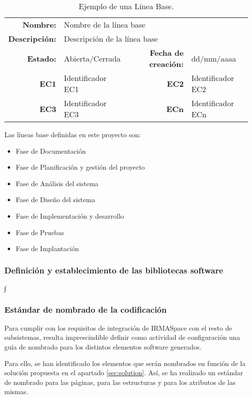 \begin{table}[h]
\begin{center}
\begin{tabular}{ r l | r l }
\hline
\textbf{Nombre:} & \multicolumn{3}{l}{Nombre de la línea base} \\
\textbf{Descripción:} & \multicolumn{3}{l}{Descripción de la línea base} \\ \hline \hline
\textbf{Estado:} & Abierta/Cerrada & \textbf{Fecha de creación:} & dd/mm/aaaa \\
\textbf{EC1} & Identificador EC1 & \textbf{EC2} & Identificador EC2 \\
\textbf{EC3} & Identificador EC3 & \textbf{ECn} & Identificador ECn \\
\hline
\end{tabular}
\caption{Ejemplo de una Línea Base.}
\label{tab:baseLine}
\end{center}
\end{table}

\par Las líneas base definidas en este proyecto son:
\begin{itemize}[-]
  \item Fase de Documentación
  \item Fase de Planificación y gestión del proyecto
  \item Fase de Análisis del sistema
  \item Fase de Diseño del sistema
  \item Fase de Implementación y desarrollo
  \item Fase de Pruebas
  \item Fase de Implantación
\end{itemize}


\subsubsection{Definición y establecimiento de las bibliotecas software}
∫

\subsubsection{Estándar de nombrado de la codificación}
\par Para cumplir con los requisitos de integración de IRMASpace con el resto de subsistemas, resulta imprescindible definir como actividad de configuración una guía de nombrado para los distintos elementos software generados.
\par Para ello, se han identificado los elementos que serán nombrados en función de la solución propuesta en el apartado \ref{sec:solution}. Así, se ha realizado un estándar de nombrado para las páginas, para las estructuras y para los atributos de las mismas.


